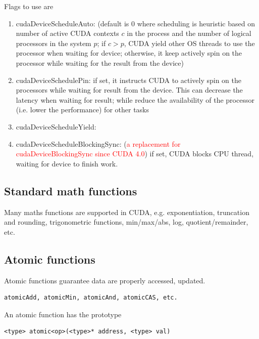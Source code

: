Flags to use are
\begin{enumerate}
  \item cudaDeviceScheduleAuto: (default is 0 where scheduling is heuristic
  based on number of active CUDA contexts $c$ in the process and the number of
  logical processors in the system $p$; if $c>p$, CUDA yield other OS threads
  to use the processor when waiting for device; otherwise, it keep actively
  spin on the processor while waiting for the result from the device)
  \item cudaDeviceSchedulePin: if set, it instructs CUDA to actively spin on the
  processors while waiting for result from the device. This can decrease the
  latency when waiting for result; while reduce the availability of the
  processor (i.e. lower the performance) for other tasks
  \item cudaDeviceScheduleYield:
  \item cudaDeviceScheduleBlockingSync: (\textcolor{red}{a replacement for
  cudaDeviceBlockingSync since CUDA 4.0}) if set, CUDA blocks CPU thread,
  waiting for device to finish work. 
\end{enumerate}



\subsection{Standard math functions}
\label{sec:stand-math-funct}

Many maths functions are supported in CUDA, e.g. exponentiation,
truncation and rounding, trigonometric functions, min/max/abs, log,
quotient/remainder, etc.

\subsection{Atomic functions}
\label{sec:atomic-functions}

Atomic functions guarantee data are properly accessed, updated.

\begin{verbatim}
atomicAdd, atomicMin, atomicAnd, atomicCAS, etc.
\end{verbatim}
An atomic function has the prototype
\begin{verbatim}
<type> atomic<op>(<type>* address, <type> val)
\end{verbatim}

